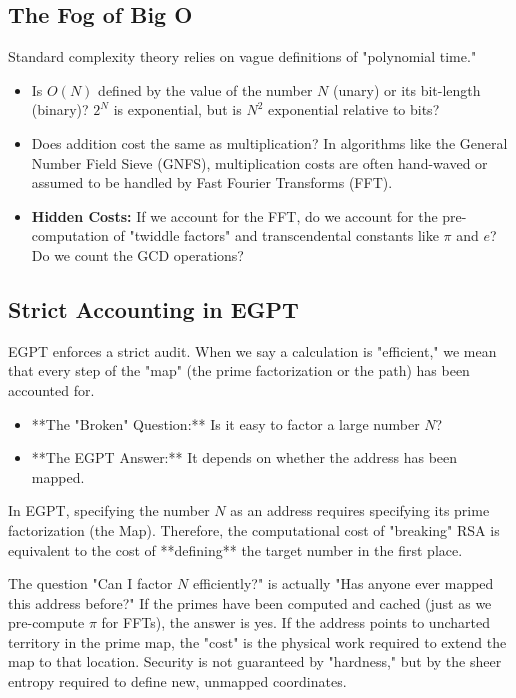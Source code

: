 \documentclass{report}
\begin{document}
\subsection{The Fog of Big O}
Standard complexity theory relies on vague definitions of "polynomial time."
\begin{itemize}
    \item Is $O(N)$ defined by the value of the number $N$ (unary) or its bit-length (binary)? $2^N$ is exponential, but is $N^2$ exponential relative to bits?
    \item Does addition cost the same as multiplication? In algorithms like the General Number Field Sieve (GNFS), multiplication costs are often hand-waved or assumed to be handled by Fast Fourier Transforms (FFT).
    \item \textbf{Hidden Costs:} If we account for the FFT, do we account for the pre-computation of "twiddle factors" and transcendental constants like $\pi$ and $e$? Do we count the GCD operations?
\end{itemize}

\subsection{Strict Accounting in EGPT}
EGPT enforces a strict audit. When we say a calculation is "efficient," we mean that every step of the "map" (the prime factorization or the path) has been accounted for.
\begin{itemize}
    \item **The "Broken" Question:** Is it easy to factor a large number $N$?
    \item **The EGPT Answer:** It depends on whether the address has been mapped.
\end{itemize}

In EGPT, specifying the number $N$ as an address requires specifying its prime factorization (the Map). Therefore, the computational cost of "breaking" RSA is equivalent to the cost of **defining** the target number in the first place.

The question "Can I factor $N$ efficiently?" is actually "Has anyone ever mapped this address before?" If the primes have been computed and cached (just as we pre-compute $\pi$ for FFTs), the answer is yes. If the address points to uncharted territory in the prime map, the "cost" is the physical work required to extend the map to that location. Security is not guaranteed by "hardness," but by the sheer entropy required to define new, unmapped coordinates.
\end{document}
